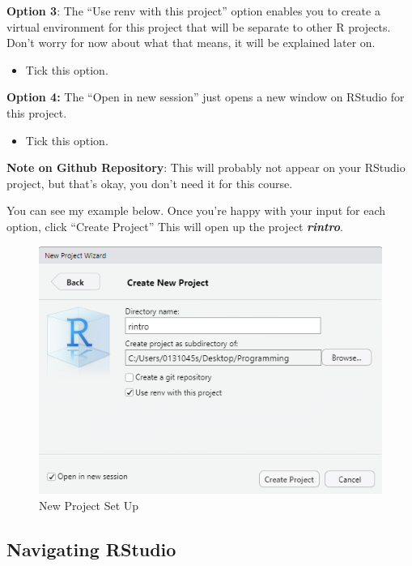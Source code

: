 \documentclass[
]{book}
\providecommand{\tightlist}{%
  \setlength{\itemsep}{0pt}\setlength{\parskip}{0pt}}
\begin{document}
\textbf{Option 3}: The ``Use renv with this project'' option enables you to create a virtual environment for this project that will be separate to other R projects. Don't worry for now about what that means, it will be explained later on.

\begin{itemize}
\tightlist
\item
  Tick this option.
\end{itemize}

\textbf{Option 4:} The ``Open in new session'' just opens a new window on RStudio for this project.

\begin{itemize}
\tightlist
\item
  Tick this option.
\end{itemize}

\textbf{Note on Github Repository}: This will probably not appear on your RStudio project, but that's okay, you don't need it for this course.

You can see my example below. Once you're happy with your input for each option, click ``Create Project'' This will open up the project \textbf{\emph{rintro}}.

\begin{figure}
\centering
\includegraphics{img/01-newproject.png}
\caption{\label{fig:unnamed-chunk-14}New Project Set Up}
\end{figure}

\hypertarget{navigating-rstudio}{%
\subsection{Navigating RStudio}\label{navigating-rstudio}}
\end{document}
